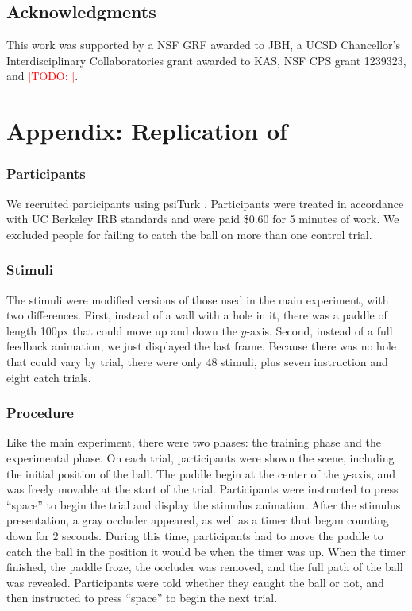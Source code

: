 \documentclass[10pt,letterpaper]{article}
\newcommand{\TODO}[1]{\textcolor{red}{[TODO: #1]}}
\begin{document}
\subsection{Acknowledgments}

This work was supported by a NSF GRF awarded to JBH, a UCSD Chancellor’s Interdisciplinary Collaboratories grant awarded to KAS, NSF CPS grant 1239323, and \TODO{}.

\section{Appendix: Replication of }

\subsubsection{Participants}

We recruited \PaddleNumComplete{} participants using psiTurk \cite{McDonnell12}.
Participants were treated in accordance with UC Berkeley IRB standards and were paid \$0.60 for 5 minutes of work.
We excluded \PaddleNumFailed{} people for failing to catch the ball on more than one control trial.

\subsubsection{Stimuli}

The stimuli were modified versions of those used in the main experiment, with two differences.
First, instead of a wall with a hole in it, there was a paddle of length 100px that could move up and down the $y$-axis.
Second, instead of a full feedback animation, we just displayed the last frame.
Because there was no hole that could vary by trial, there were only 48 stimuli, plus seven instruction and eight catch trials.

\subsubsection{Procedure}

Like the main experiment, there were two phases: the training phase and the experimental phase.
On each trial, participants were shown the scene, including the initial position of the ball.
The paddle begin at the center of the $y$-axis, and was freely movable at the start of the trial.
Participants were instructed to press ``space'' to begin the trial and display the stimulus animation.
After the stimulus presentation, a gray occluder appeared, as well as a timer that began counting down for 2 seconds.
During this time, participants had to move the paddle to catch the ball in the position it would be when the timer was up.
When the timer finished, the paddle froze, the occluder was removed, and the full path of the ball was revealed.
Participants were told whether they caught the ball or not, and then instructed to press ``space'' to begin the next trial.
\end{document}
